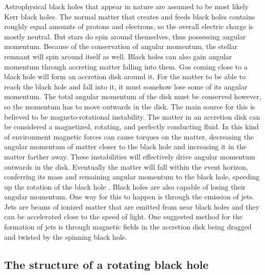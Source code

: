 \documentclass[english, oneside]{HYgradu}
\begin{document}
Astrophysical black holes that appear in nature are assumed to be most likely Kerr black holes. The normal matter that creates and feeds black holes contains roughly equal amounts of protons and electrons, so the overall electric charge is mostly neutral. But stars do spin around themselves, thus possessing angular momentum. Because of the conservation of angular momentum, the stellar remnant will spin around itself as well. Black holes can also gain angular momentum through accreting matter falling into them. Gas coming close to a black hole will form an accretion disk around it. For the matter to be able to reach the black hole and fall into it, it must somehow lose some of its angular momentum. The total angular momentum of the disk must be conserved however, so the momentum has to move outwards in the disk.
The main source for this is believed to be magneto-rotational instability. The matter in an accretion disk can be considered a magnetized, rotating, and perfectly conducting fluid. In this kind of environment magnetic forces can cause torques on the matter, decreasing the angular momentum of matter closer to the black hole and increasing it in the matter farther away. These instabilities will effectively drive angular momentum outwards in the disk.
Eventually the matter will fall within the event horizon, conferring its mass and remaining angular momentum to the black hole, speeding up the rotation of the black hole \citep{bhphysics}. Black holes are also capable of losing their angular momentum. One way for this to happen is through the emission of jets. Jets are beams of ionized matter that are emitted from near black holes and they can be accelerated close to the speed of light. One suggested method for the formation of jets is through magnetic fields in the accretion disk being dragged and twisted by the spinning black hole.

\subsection{The structure of a rotating black hole}
\end{document}
